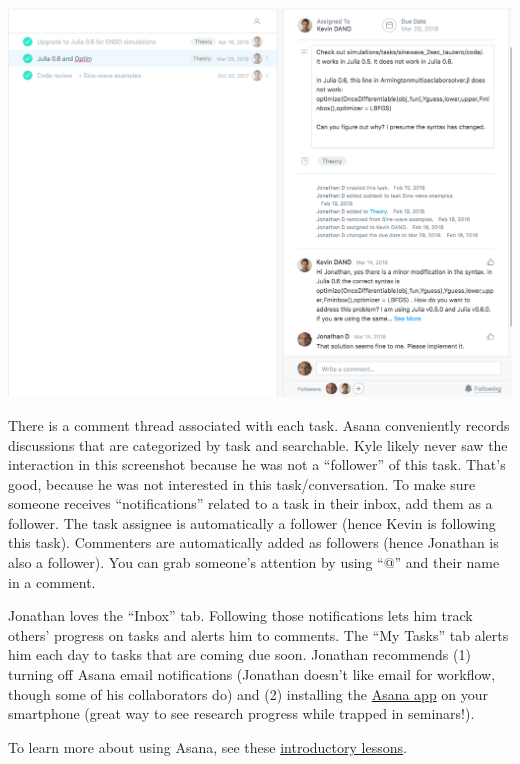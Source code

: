 \begin{center}
\includegraphics[width=.8\textwidth]{./figures/workflow/asana_screenshot2.png}
\end{center}

There is a comment thread associated with each task.
Asana conveniently records discussions that are categorized by task and searchable.
Kyle likely never saw the interaction in this screenshot because he was not a ``follower'' of this task.
That's good, because he was not interested in this task/conversation.
To make sure someone receives ``notifications'' related to a task in their inbox, add them as a follower.
The task assignee is automatically a follower (hence Kevin is following this task).
Commenters are automatically added as followers (hence Jonathan is also a follower).
You can grab someone's attention by using ``@'' and their name in a comment.


Jonathan loves the ``Inbox'' tab.
Following those notifications lets him track others' progress on tasks and alerts him to comments.
The ``My Tasks'' tab alerts him each day to tasks that are coming due soon.
Jonathan recommends 
(1) turning off Asana email notifications (Jonathan doesn't like email for workflow, though some of his collaborators do)
and 
(2) installing the \href{https://asana.com/apps/asana}{Asana app} on your smartphone (great way to see research progress while trapped in seminars!).



To learn more about using Asana, see these \href{https://asana.com/guide/resources/get-started/quick-start#lessons?lesson=tasks-1}{introductory lessons}.